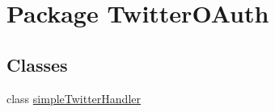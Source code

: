 \hypertarget{namespace_twitter_o_auth}{\section{Package Twitter\-O\-Auth}
\label{namespace_twitter_o_auth}
}
\subsection*{Classes}
\begin{DoxyCompactItemize}
\item 
class \hyperlink{class_twitter_o_auth_1_1simple_twitter_handler}{simple\-Twitter\-Handler}
\end{DoxyCompactItemize}
